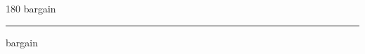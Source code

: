 
\begin{frame}
\begin{center}
\begin{turn}{180}
{\fontsize{2.5cm}{1em}\selectfont bargain}
\end{turn}
\vspace{1em}\par  
\hrule
\vspace{1em}\par  
{\fontsize{2.5cm}{1em}\selectfont bargain}
\end{center}
\end{frame}

